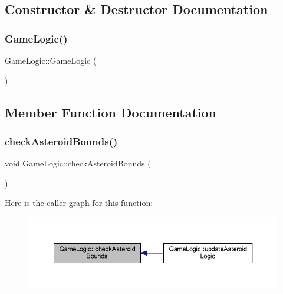 \subsection{Constructor \& Destructor Documentation}
\mbox{\label{class_game_logic_a996cd781691c36922e7ce792fcb21640}} 
\subsubsection{\texorpdfstring{Game\+Logic()}{GameLogic()}}
{\footnotesize\ttfamily Game\+Logic\+::\+Game\+Logic (\begin{DoxyParamCaption}{ }\end{DoxyParamCaption})}



\subsection{Member Function Documentation}
\mbox{\label{class_game_logic_a35dcb163c584e620b876def784cbd7a4}} 
\subsubsection{\texorpdfstring{check\+Asteroid\+Bounds()}{checkAsteroidBounds()}}
{\footnotesize\ttfamily void Game\+Logic\+::check\+Asteroid\+Bounds (\begin{DoxyParamCaption}{ }\end{DoxyParamCaption})}

Here is the caller graph for this function\+:
\nopagebreak
\begin{figure}[H]
\begin{center}
\leavevmode
\includegraphics[width=350pt]{class_game_logic_a35dcb163c584e620b876def784cbd7a4_icgraph}
\end{center}
\end{figure}
\mbox{\label{class_game_logic_aa0800f256ffc094ee5373d372c26c2ea}} 
